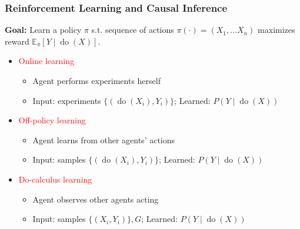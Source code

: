 \documentclass[UTF8,11pt,colorlinks,compress,openany]{beamer}%
\begin{document}
\begin{frame}\frametitle{Reinforcement Learning and Causal Inference}
\textbf{Goal:} Learn a policy $\pi$ s.t. sequence of actions $\pi(\cdot)=(X_1,\dots X_n)$ maximizes reward $\mathbb{E}_\pi[Y\mid \operatorname{do}(X)]$.
\begin{itemize}
	\item \textcolor{red}{Online learning}
	\begin{itemize}
		\item Agent performs experiments herself
		\item Input: experiments $\{(\operatorname{do}(X_i),Y_i)\}$; Learned: $P(Y\mid \operatorname{do}(X))$
	\end{itemize}
	\item \textcolor{red}{Off-policy learning}
	\begin{itemize}
		\item Agent learns from other agents' actions
		\item Input: samples $\{(\operatorname{do}(X_i),Y_i)\}$; Learned: $P(Y\mid \operatorname{do}(X))$
	\end{itemize}
	\item \textcolor{red}{Do-calculus learning}
	\begin{itemize}
		\item Agent observes other agents acting
		\item Input: samples $\{(X_i,Y_i)\}, G$; Learned: $P(Y\mid \operatorname{do}(X))$
	\end{itemize}
\end{itemize}
\end{frame}
\end{document}
